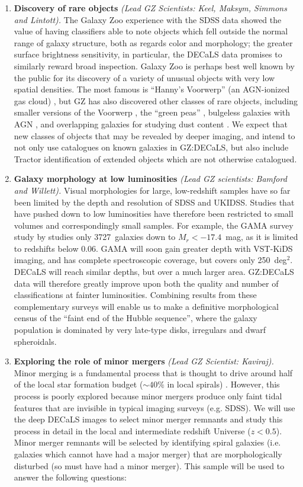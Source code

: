 \documentclass[iop,apj,tighten]{emulateapj}
\begin{document}
\begin{enumerate}
    \item \textbf{Discovery of rare objects} \textit{ (Lead GZ Scientists: Keel, Maksym, Simmons and Lintott).} The Galaxy Zoo experience with the SDSS data showed the value of having classifiers able to note objects which fell outside the normal range of galaxy structure, both as regards color and morphology; the greater surface brightness sensitivity, in particular, the DECaLS data promises to similarly reward broad inspection. Galaxy Zoo is perhaps best well known by the public for its discovery of a variety of unusual objects with very low spatial densities. The most famous is ``Hanny's Voorwerp'' (an AGN-ionized gas cloud) \citep{lin09}, but GZ has also discovered other classes of rare objects, including smaller versions of the Voorwerp \citep{kee12}, the ``green peas'' \citep[compact star forming galaxies;][]{car09}, bulgeless galaxies with AGN \citep{sim13}, and overlapping galaxies for studying dust content \citep{kee13}. We expect that new classes of objects that may be revealed by deeper imaging, and intend to not only use catalogues on known galaxies in GZ:DECaLS, but also include Tractor identification of extended objects which are not otherwise catalogued.
    \item \textbf{Galaxy morphology at low luminosities} \textit{ (Lead GZ scientists: Bamford and Willett).} Visual morphologies for large, low-redshift samples have so far been limited by the depth and resolution of SDSS and UKIDSS. Studies that have pushed down to low luminosities have therefore been restricted to small volumes and correspondingly small samples. For example, the GAMA survey study by \citet{kel14a} studies only 3727~galaxies down to $M_r < -17.4$~mag, as it is limited to redshifts below $0.06$. GAMA will soon gain greater depth with VST-KiDS imaging, and has complete spectroscopic coverage, but covers only 250~deg$^2$. DECaLS will reach similar depths, but over a much larger area. GZ:DECaLS data will therefore greatly improve upon both the quality and number of classifications at fainter luminosities. Combining results from these complementary surveys will enable us to make a definitive morphological census of the ``faint end of the Hubble sequence'', where the galaxy population is dominated by very late-type disks, irregulars and dwarf spheroidals.
    \item \textbf{Exploring the role of minor mergers} \textit{ (Lead GZ Scientist: Kaviraj).} Minor merging is a fundamental process that is thought to drive around half of the local star formation budget ($\sim40\%$ in local spirals) \citep{kav14a}. However, this process is poorly explored because minor mergers produce only faint tidal features that are invisible in typical imaging surveys (e.g. SDSS). We will use the deep DECaLS images to select minor merger remnants and study this process in detail in the local and intermediate redshift Universe ($z < 0.5$). Minor merger remnants will be selected by identifying spiral galaxies (i.e. galaxies which cannot have had a major merger) that are morphologically disturbed (so must have had a minor merger). This sample will be used to answer the following questions:

\end{enumerate}
\end{document}
